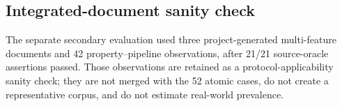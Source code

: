 \subsection{Integrated-document sanity check}

The separate secondary evaluation used three project-generated multi-feature documents and 42 property--pipeline observations, after 21/21 source-oracle assertions passed. Those observations are retained as a protocol-applicability sanity check; they are not merged with the 52 atomic cases, do not create a representative corpus, and do not estimate real-world prevalence.
